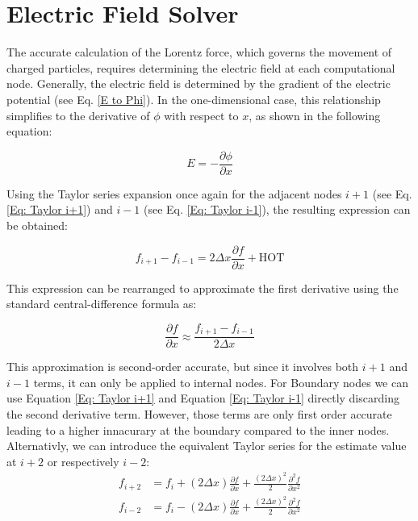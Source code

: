 \section{Electric Field Solver}
The accurate calculation of the Lorentz force, which governs the movement of charged particles, requires determining the electric field at each computational node. Generally, the electric field is determined by the gradient of the electric potential (see Eq. \ref{E to Phi}). In the one-dimensional case, this relationship simplifies to the derivative of $\phi$ with respect to $x$, as shown in the following equation:

\begin{equation}
E = -\frac{\partial \phi}{\partial x}
\end{equation}

Using the Taylor series expansion once again for the adjacent nodes $i+1$ (see Eq. \ref{Eq: Taylor i+1}) and  $i-1$ (see Eq. \ref{Eq: Taylor i-1}), the resulting expression can be obtained:

\begin{equation}
    f_{i+1} - f_{i-1} = 2\Delta x \frac{\partial f}{\partial x} + \text{HOT}
\end{equation}

This expression can be rearranged to approximate the first derivative using the standard central-difference formula as:

\begin{equation}\label{Eq: Electric field 1d central}
    \frac{\partial f}{\partial x} \approx \frac{f_{i+1} - f_{i-1}}{2\Delta x}
\end{equation}

This approximation is second-order accurate, but since it involves both $i+1$ and $i-1$ terms, it can only be applied to internal nodes. For Boundary nodes we can use Equation \ref{Eq: Taylor i+1} and Equation \ref{Eq: Taylor i-1} directly discarding the second derivative term. However, those terms are only first order accurate leading to a higher innacurary at the boundary compared to the inner nodes. Alternativly, we can introduce the equivalent Taylor series for the estimate value at $i+2$ or respectively $i-2$:
\begin{align}
    f_{i+2} &= f_i + (2\Delta x) \frac{\partial f}{\partial x} + \frac{(2\Delta x)^2}{2} \frac{\partial^2 f}{\partial x^2} \\
    f_{i-2} &= f_i - (2\Delta x) \frac{\partial f}{\partial x} + \frac{(2\Delta x)^2}{2} \frac{\partial^2 f}{\partial x^2}
\end{align}

